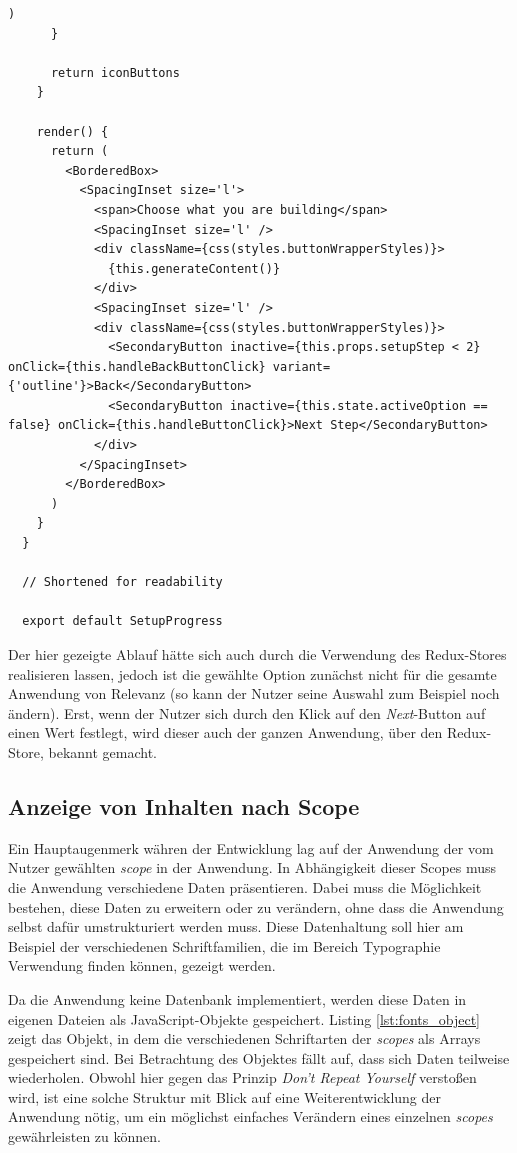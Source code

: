 \begin{lstlisting}[caption=Die Komponente \texttt{SetupProgress} in gekürzter Form, label=lst:setup]
        )
      }

      return iconButtons
    }

    render() {
      return (
        <BorderedBox>
          <SpacingInset size='l'>
            <span>Choose what you are building</span>
            <SpacingInset size='l' />
            <div className={css(styles.buttonWrapperStyles)}>
              {this.generateContent()}
            </div>
            <SpacingInset size='l' />
            <div className={css(styles.buttonWrapperStyles)}>
              <SecondaryButton inactive={this.props.setupStep < 2} onClick={this.handleBackButtonClick} variant={'outline'}>Back</SecondaryButton>
              <SecondaryButton inactive={this.state.activeOption == false} onClick={this.handleButtonClick}>Next Step</SecondaryButton>
            </div>
          </SpacingInset>
        </BorderedBox>
      )
    }
  }

  // Shortened for readability

  export default SetupProgress
\end{lstlisting}

Der hier gezeigte Ablauf hätte sich auch durch die Verwendung des Redux-Stores realisieren lassen, jedoch ist die gewählte Option zunächst nicht für die gesamte Anwendung von Relevanz (so kann der Nutzer seine Auswahl zum Beispiel noch ändern). Erst, wenn der Nutzer sich durch den Klick auf den \textit{Next}-Button auf einen Wert festlegt, wird dieser auch der ganzen Anwendung, über den Redux-Store, bekannt gemacht.

\subsection{Anzeige von Inhalten nach Scope}
Ein Hauptaugenmerk währen der Entwicklung lag auf der Anwendung der vom Nutzer gewählten \textit{scope} in der Anwendung. In Abhängigkeit dieser Scopes muss die Anwendung verschiedene Daten präsentieren. Dabei muss die Möglichkeit bestehen, diese Daten zu erweitern oder zu verändern, ohne dass die Anwendung selbst dafür umstrukturiert werden muss. Diese Datenhaltung soll hier am Beispiel der verschiedenen Schriftfamilien, die im Bereich Typographie Verwendung finden können, gezeigt werden.

Da die Anwendung keine Datenbank implementiert, werden diese Daten in eigenen Dateien als JavaScript-Objekte gespeichert. Listing \ref{lst:fonts_object} zeigt das Objekt, in dem die verschiedenen Schriftarten der \textit{scopes} als Arrays gespeichert sind. Bei Betrachtung des Objektes fällt auf, dass sich Daten teilweise wiederholen. Obwohl hier gegen das Prinzip \textit{Don’t Repeat Yourself} verstoßen wird, ist eine solche Struktur mit Blick auf eine Weiterentwicklung der Anwendung nötig, um ein möglichst einfaches Verändern eines einzelnen \textit{scopes} gewährleisten zu können.

